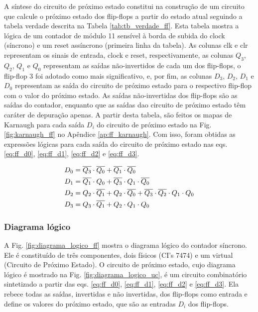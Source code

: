 \documentclass[a4,12pt]{horizon-theme}
\begin{document}
A síntese do circuito de próximo estado constitui na construção de um circuito que calcule o próximo estado dos flip-flops a partir do estado atual seguindo a tabela verdade descrita na Tabela \ref{tab:tb_verdade_ff}. Esta tabela mostra a lógica de um contador de módulo 11 sensível à borda de subida do clock (síncrono) e um reset assíncrono (primeira linha da tabela). As colunas clk e clr representam os sinais de entrada, clock e reset, respectivamente, as colunas $Q_3$, $Q_2$, $Q_1$ e $Q_0$ representam as saídas não-invertidos de cada um dos flip-flops, o flip-flop 3 foi adotado como mais significativo, e, por fim, as colunas $D_3$, $D_2$, $D_1$ e $D_0$ representam as saída do circuito de próximo estado para o respectivo flip-flop com o valor do próximo estado. As saídas não-invertidas dos flip-flops são as saídas do contador, enquanto que as saídas dao circuito de próximo estado têm caráter de depuração apenas. A partir desta tabela, são feitos os mapas de Karnaugh para cada saída $D_i$ do circuito de próximo estado na Fig. \ref{fig:karnaugh_ff} no Apêndice \ref{ap:ff_karnaugh}. Com isso, foram obtidas as expressões lógicas para cada saída do circuito de próximo estado nas eqs. \eqref{eq:ff_d0}, \eqref{eq:ff_d1}, \eqref{eq:ff_d2} e \eqref{eq:ff_d3}.

\begin{align}
  D_0 & = \overline{Q_3} \cdot \overline{Q_0} + \overline{Q_1} \cdot \overline{Q_0}\label{eq:ff_d0}                                     \\
  D_1 & = \overline{Q_1} \cdot Q_0 + \overline{Q_3} \cdot Q_1 \cdot \overline{Q_0}\label{eq:ff_d1}                               \\
  D_2 & = Q_2 \cdot \overline{Q_1} + Q_2 \cdot \overline{Q_0} + \overline{Q_3} \cdot \overline{Q_2} \cdot Q_1 \cdot Q_0\label{eq:ff_d2} \\
  D_3 & = Q_3 \cdot \overline{Q_1} + Q_2 \cdot Q_1 \cdot Q_0\label{eq:ff_d3}
\end{align}




\subsubsection{Diagrama lógico}
\label{sec:plan_ff_logico}

A Fig. \ref{fig:diagrama_logico_ff} mostra o diagrama lógico do contador síncrono. Ele é constituído de três componentes, dois físicos (CI's 7474) e um virtual (Circuito de Próximo Estado). O circuito de próximo estado, cujo diagrama lógico é mostrado na Fig. \ref{fig:diagrama_logico_uc}, é um circuito combinatório sintetizado a partir das eqs. \eqref{eq:ff_d0}, \eqref{eq:ff_d1}, \eqref{eq:ff_d2} e \eqref{eq:ff_d3}. Ela rebece todas as saídas, invertidas e não invertidas, dos flip-flops como entrada e define os valores do próximo estado, que são as entradas $D_i$ dos flip-flops.
\end{document}
